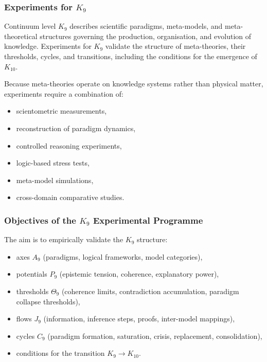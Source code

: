 
\subsubsection{Experiments for \texorpdfstring{$K_9$}{K_9}}
\label{sec:experiments-k9}

Continuum level $K_9$ describes scientific paradigms, 
meta-models, and meta-theoretical structures governing the 
production, organisation, and evolution of knowledge.  
Experiments for $K_9$ validate the structure of meta-theories,
their thresholds, cycles, and transitions, including the
conditions for the emergence of $K_{10}$.

Because meta-theories operate on knowledge systems rather than 
physical matter, experiments require a combination of:

\begin{itemize}
    \item scientometric measurements,
    \item reconstruction of paradigm dynamics,
    \item controlled reasoning experiments,
    \item logic-based stress tests,
    \item meta-model simulations,
    \item cross-domain comparative studies.
\end{itemize}



\subsubsection{Objectives of the \texorpdfstring{$K_9$}{K_9} Experimental Programme}

The aim is to empirically validate the $K_9$ structure:

\begin{itemize}
    \item axes $A_9$ (paradigms, logical frameworks, model categories),
    \item potentials $P_9$ (epistemic tension, coherence, explanatory power),
    \item thresholds $\Theta_9$ (coherence limits, contradiction accumulation,
          paradigm collapse thresholds),
    \item flows $J_9$ (information, inference steps, proofs, 
          inter-model mappings),
    \item cycles $C_9$ (paradigm formation, saturation, crisis, 
          replacement, consolidation),
    \item conditions for the transition $K_9 \to K_{10}$.
\end{itemize}



